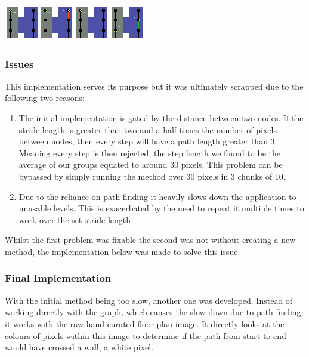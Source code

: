 \documentclass[main.tex]{subfiles}
\begin{document}
\begin{center}
\includegraphics[scale=1.5]{images-implementation/collision1.png}
\label{fig:iniCol}
\end{center}

\subsubsection{Issues}

This implementation serves its purpose but it was ultimately scrapped due to the following two reasons:

\begin{enumerate}
	\item The initial implementation is gated by the distance between two nodes. If the stride length is greater than two and a half times the number of pixels between nodes, then every step will have a path length greater than 3. Meaning every step is then rejected, the step length we found to be the average of our groups equated to around 30 pixels. This problem can be bypassed by simply running the method over 30 pixels in 3 chunks of 10.
	\item Due to the reliance on path finding it heavily slows down the application to unusable levels. This is exacerbated by the need to repeat it multiple times to work over the set stride length
\end{enumerate}

Whilst the first problem was fixable the second was not without creating a new method, the implementation below was made to solve this issue.

\subsubsection{Final Implementation}

With the initial method being too slow, another one was developed. Instead of working directly with the graph, which causes the slow down due to path finding, it works with the raw hand curated floor plan image. It directly looks at the colours of pixels within this image to determine if the path from start to end would have crossed a wall, a white pixel.
\end{document}
